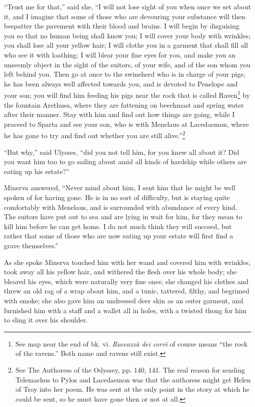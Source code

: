 “Trust me for that,” said she, “I will not lose sight of you when once we set
about it, and I imagine that some of those who are devouring your substance
will then bespatter the pavement with their blood and brains. I will begin by
disguising you so that no human being shall know you; I will cover your body
with wrinkles; you shall lose all your yellow hair; I will clothe you in a
garment that shall fill all who see it with loathing; I will blear your fine
eyes for you, and make you an unseemly object in the sight of the suitors, of
your wife, and of the son whom you left behind you. Then go at once to the
swineherd who is in charge of your pigs; he has been always well affected
towards you, and is devoted to Penelope and your son; you will find him feeding
his pigs near the rock that is called Raven\footnote{See map near the end of bk. vi. \emph{Ruccazzù dei corvi} of course means
“the rock of the ravens.” Both name and ravens still exist.} by the fountain Arethusa, where
they are fattening on beechmast and spring water after their manner. Stay with
him and find out how things are going, while I proceed to Sparta and see your
son, who is with Menelaus at Lacedaemon, where he has gone to try and find out
whether you are still alive.”\footnote{See The Authoress of the Odyssey, pp. 140, 141. The real reason for sending
Telemachus to Pylos and Lacedaemon was that the authoress might get Helen of
Troy into her poem. He was sent at the only point in the story at which he
could be sent, so he must have gone then or not at all.}

“But why,” said Ulysses, “did you not tell him, for you knew all about it? Did
you want him too to go sailing about amid all kinds of hardship while others
are eating up his estate?”

Minerva answered, “Never mind about him, I sent him that he might be well
spoken of for having gone. He is in no sort of difficulty, but is staying quite
comfortably with Menelaus, and is surrounded with abundance of every kind. The
suitors have put out to sea and are lying in wait for him, for they mean to
kill him before he can get home. I do not much think they will succeed, but
rather that some of those who are now eating up your estate will first find a
grave themselves.”

As she spoke Minerva touched him with her wand and covered him with wrinkles,
took away all his yellow hair, and withered the flesh over his whole body; she
bleared his eyes, which were naturally very fine ones; she changed his clothes
and threw an old rag of a wrap about him, and a tunic, tattered, filthy, and
begrimed with smoke; she also gave him an undressed deer skin as an outer
garment, and furnished him with a staff and a wallet all in holes, with a
twisted thong for him to sling it over his shoulder.

